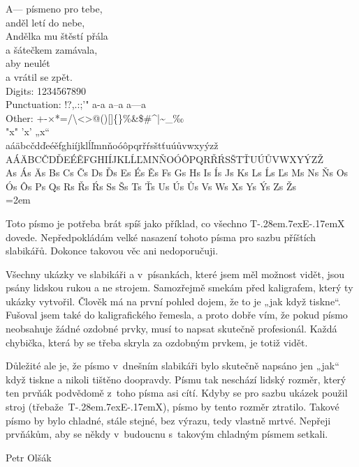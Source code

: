\documentclass{article}
\begin{document}
\fontsize{25pt}{30pt}

\noindent A--- písmeno pro tebe,\\
anděl letí do nebe,\\
Andělka mu štěstí přála\\
a šátečkem zamávala,\\
aby neulét\\
a vrátil se zpět.\\

\noindent Digits: 1234567890\\
Punctuation: !?,.:;'" a-a a--a a---a\\
Other: +-×*=/\textbackslash <>@()[]\{\}\%\&\$\#\^{}|\~{}\_‰\\
"x" 'x' „x“\\
aáäbcčdďeéěfghiíjklĺľmnňoóôpqrřŕsštťuúůvwxyýzž\\
AÁÄBCČDĎEÉĚFGHIÍJKLĹĽMNŇOÓÔPQRŘŔSŠTŤUÚŮVWXYÝZŽ\\
As Ás Äs Bs Cs Čs Ds Ďs Es És Ěs Fs Gs Hs Is Ís Js Ks Ls Ĺs Ľs Ms Ns Ňs Os Ós Ôs Ps Qs Rs Řs Ŕs Ss Šs Ts Ťs Us Ús Ůs Vs Ws Xs Ys Ýs Zs Žs\\


\def\TeX{T\kern-.28em\lower.7ex\hbox{E}\kern-.17emX}
  \emergencystretch=2em

Toto písmo je potřeba brát spíš jako příklad, co všechno \TeX{} dovede.
Nepředpokládám velké nasazení tohoto písma pro sazbu příštích
slabikářů. Dokonce takovou věc ani nedoporučuji.

Všechny ukázky ve slabikáři a v~písankách, které jsem měl možnost vidět,
jsou psány lidskou rukou a ne strojem. Samozřejmě smekám před kaligrafem,
který ty ukázky vytvořil. Člověk má na první pohled dojem, že to je
„jak když tiskne“. Fušoval jsem také do kaligrafického řemesla, a proto
dobře vím, že pokud písmo neobsahuje žádné ozdobné prvky, musí to napsat
skutečně profesionál. Každá chybička, která by se třeba skryla za ozdobným
prvkem, je totiž vidět.

Důležité ale je, že písmo v~dnešním slabikáři bylo skutečně napsáno jen
„jak“ když tiskne a nikoli tištěno doopravdy. Písmu tak neschází
lidský rozměr, který ten prvňák podvědomě z~toho písma asi cítí. Kdyby se
pro sazbu ukázek použil stroj (třebaže~\TeX), písmo by tento rozměr
ztratilo. Takové písmo by bylo chladné, stále stejné, bez výrazu,
tedy vlastně mrtvé. Nepřeji prvňákům, aby se někdy v~budoucnu
s~takovým chladným písmem setkali.

\medskip
\hfill Petr Olšák
\end{document}

